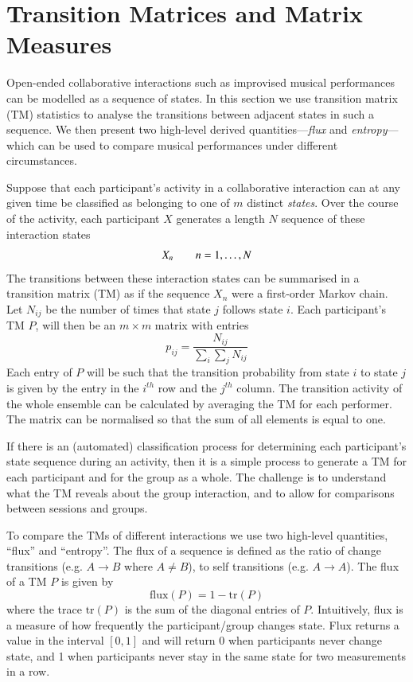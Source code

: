 \documentclass{sigchi}
\begin{document}
\section{Transition Matrices and Matrix Measures}

Open-ended collaborative interactions such as improvised musical
performances can be modelled as a sequence of
states\cite{Thimbleby:2001kq,Swift:2014tya}. In this section we use
transition matrix (TM) statistics to analyse the transitions between
adjacent states in such a sequence. We then present two high-level
derived quantities---\emph{flux} and \emph{entropy}---which can be
used to compare musical performances under different circumstances.

Suppose that each participant's activity in a collaborative
interaction can at any given time be classified as belonging to one of
$m$ distinct \emph{states}. Over the course of the activity, each
participant $X$ generates a length $N$ sequence of these interaction
states
\begin{equation}
 X_n \hskip 2em n = 1, \ldots, N
\end{equation}
The transitions between these interaction states can be summarised in
a transition matrix (TM) as if the sequence $X_n$ were a first-order Markov
chain. Let $N_{ij}$ be the number of times that state $j$ follows
state $i$. Each participant's TM $P$, will then be an
$m \times m$ matrix with entries
\begin{equation}
  p_{ij} = \frac{N_{ij}}{\sum_i \sum_j N_{ij}}
\end{equation}
Each entry of $P$ will be such that the transition probability from
state $i$ to state $j$ is given by the entry in the $i^{th}$ row and
the $j^{th}$ column. The transition activity of the whole ensemble can
be calculated by averaging the TM for each performer.
The matrix can be normalised so that the sum of all elements is equal
to one.

If there is an (automated) classification process for determining each
participant's state sequence during an activity, then it is a simple
process to generate a TM for each participant and for the group as a
whole. The challenge is to understand what the TM reveals about the
group interaction, and to allow for comparisons between sessions and
groups.

To compare the TMs of different interactions we use two high-level
quantities, ``flux'' and ``entropy''. The flux of a sequence is
defined as the ratio of change transitions (e.g. $A \rightarrow B$
where $A \neq B$), to self transitions (e.g. $A \rightarrow A $). The
flux of a TM $P$ is given by
\begin{equation}
  \mathrm{flux}(P) = 1 - \mathrm{tr}(P)
\end{equation}
where the trace $\mathrm{tr}(P)$ is the sum of the diagonal entries of
$P$. Intuitively, flux is a measure of how frequently the participant/group
changes state. Flux returns a value in the interval $[0,1]$ and will
return 0 when participants never change state, and 1 when participants
never stay in the same state for two measurements in a row.
\end{document}

